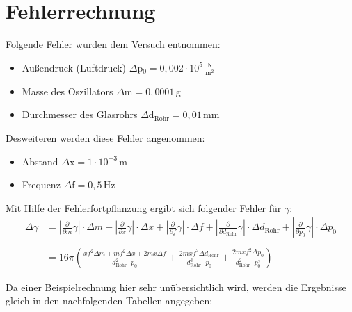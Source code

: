 \documentclass[fontsize=12pt]{scrartcl}
\renewcommand{\l}{\left\vert}
\renewcommand{\r}{\right\vert}
\begin{document}
\newpage
\section{Fehlerrechnung}

Folgende Fehler wurden dem Versuch entnommen:
\begin{itemize}
\item Außendruck (Luftdruck) $\Delta $p$_0= 0, 002\cdot 10^5\,\frac{\text{N}}{\text{m}^2}$
\item Masse des Oszillators $\Delta $m$= 0, 0001$\,g
\item Durchmesser des Glasrohrs $\Delta $d$_{\text{Rohr}}=0, 01$\,mm
\end{itemize}
Desweiteren werden diese Fehler angenommen:
\begin{itemize}
\item Abstand  $\Delta $x$= 1\cdot 10^{-3}\,\text{m}$
\item Frequenz $\Delta $f$= 0,5$\,Hz
\end{itemize}

Mit Hilfe der Fehlerfortpflanzung ergibt sich folgender Fehler für $\gamma$:
\begin{align*}
\Delta \gamma &= \l \frac{\partial}{\partial m} \gamma \r \cdot \Delta m + \l \frac{\partial}{\partial x} \gamma \r \cdot \Delta x+ \l \frac{\partial}{\partial f} \gamma \r \cdot \Delta f +\l \frac{\partial}{\partial d_{\text{Rohr}}} \gamma \r \cdot \Delta d_{\text{Rohr}}+ \l \frac{\partial}{\partial p_{0}} \gamma \r \cdot \Delta p_{0}\\
~\\
&= 16\pi (\frac{x f^2 \Delta m + m f^2 \Delta x + 2mx\Delta f}{d_{\text{Rohr}}^2 \cdot p_0} +\frac{ 2mx f^2 \Delta d_{\text{Rohr}} }{d_{\text{Rohr}}^3 \cdot p_0} + \frac{ 2mx f^2 \Delta  p_0 }{d_{\text{Rohr}}^2 \cdot p_0^2})
\end{align*}

Da einer Beispielrechnung hier sehr unübersichtlich wird, werden die Ergebnisse gleich in den nachfolgenden Tabellen angegeben:
\end{document}

